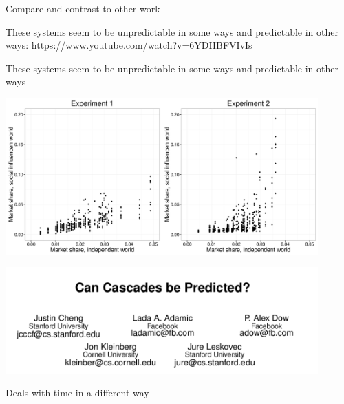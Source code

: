 \documentclass[aspectratio=169]{beamer}
\begin{document}
\begin{frame}

\begin{center}
\Large{
Compare and contrast to other work
}
\end{center}

\end{frame}
\begin{frame}

These systems seem to be unpredictable in some ways and predictable in other ways:
\url{https://www.youtube.com/watch?v=6YDHBFVIvIs}

\end{frame}
\begin{frame}

These systems seem to be unpredictable in some ways and predictable in other ways \pause
\begin{center}
\includegraphics[width = 0.9\textwidth]{figures/bitbybit4-23_salganik_experimental_2006_fig3ac}
\end{center}

\end{frame}
\begin{frame}

\begin{center}
\includegraphics[width = 0.9\textwidth]{figures/cheng_can_2014_title}
\end{center}

\vfill
Deals with time in a different way 
\end{frame}
\end{document}
